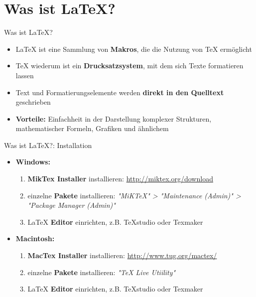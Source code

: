 \section{Was ist \LaTeX?}

\begin{frame}{Was ist \LaTeX?}
\begin{itemize}
    \item \LaTeX{} ist eine Sammlung von \textbf{Makros}, die die Nutzung von \TeX{} ermöglicht
    \newline
    \item \TeX{} wiederum ist ein \textbf{Drucksatzsystem}, mit dem sich Texte formatieren lassen
    \newline
    \item Text und Formatierungselemente werden \textbf{direkt in den Quelltext} geschrieben
    \newline
    \item \textbf{Vorteile:} Einfachheit in der Darstellung komplexer Strukturen, mathematischer Formeln, Grafiken und ähnlichem
\end{itemize}
    
\end{frame}

\begin{frame}{Was ist \LaTeX?: Installation}
\begin{itemize}
\item \textbf{Windows:}
\begin{enumerate}
\item \textbf{MikTex Installer} installieren: \url{http://miktex.org/download}
\item einzelne \textbf{Pakete} installieren: \textit{"MiKTeX" > "Maintenance (Admin)" > "Package Manager (Admin)"}
\item \LaTeX{} \textbf{Editor} einrichten, z.B. TeXstudio oder Texmaker
\end{enumerate}
\item \textbf{Macintosh:}
\begin{enumerate}
\item \textbf{MacTex Installer} installieren: \url{http://www.tug.org/mactex/}
\item einzelne \textbf{Pakete} installieren: \textit{"TeX Live Utiility"}
\item \LaTeX{} \textbf{Editor} einrichten, z.B. TeXstudio oder Texmaker
\end{enumerate}
\end{itemize}
\end{frame}

